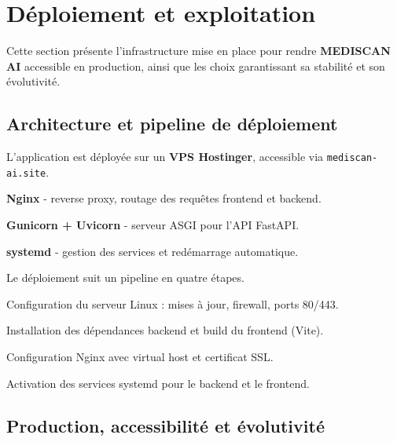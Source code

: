 \documentclass[12pt,a4paper]{article}
\newcommand{\NewMajorPart}{\clearpage}
\begin{document}
\NewMajorPart
\section{Déploiement et exploitation}

\vspace{0.2cm}
Cette section présente l'infrastructure mise en place pour rendre \textbf{MEDISCAN AI}
accessible en production, ainsi que les choix garantissant sa stabilité et son évolutivité.

\subsection{Architecture et pipeline de déploiement}

\vspace{0.2cm}
L'application est déployée sur un \textbf{VPS Hostinger},
accessible via \texttt{mediscan-ai.site}.

\begin{sq}
  \item \textbf{Nginx} - reverse proxy, routage des requêtes frontend et backend.
  \item \textbf{Gunicorn + Uvicorn} - serveur ASGI pour l'API FastAPI.
  \item \textbf{systemd} - gestion des services et redémarrage automatique.
\end{sq}

\vspace{0.2cm}
Le déploiement suit un pipeline en quatre étapes.

\begin{num}
  \item Configuration du serveur Linux : mises à jour, firewall, ports 80/443.
  \item Installation des dépendances backend et build du frontend (Vite).
  \item Configuration Nginx avec virtual host et certificat SSL.
  \item Activation des services systemd pour le backend et le frontend.
\end{num}

\subsection{Production, accessibilité et évolutivité}
\end{document}
